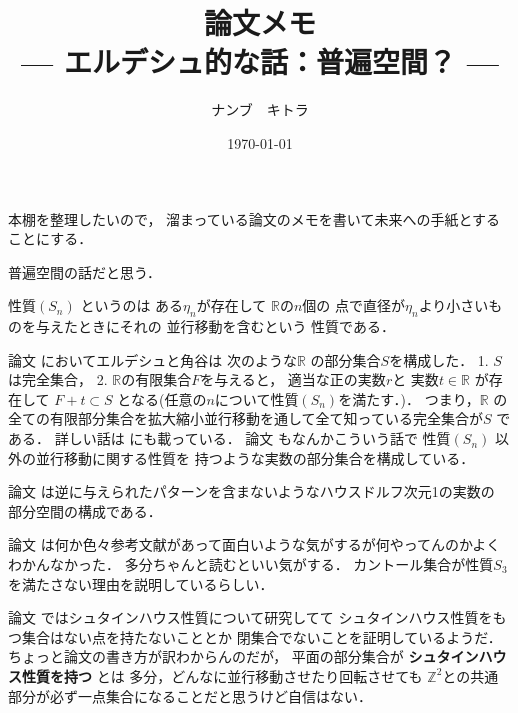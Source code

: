 \documentclass[leqno, a4paper, 12pt]{jsarticle}
\title{論文メモ
\large{\\--- エルデシュ的な話：普遍空間？ ---}
}
\author{ナンブ　キトラ}
\date{\today}
\newcommand{\zz}{\mathbb{Z}}
\newcommand{\rr}{\mathbb{R}}
\begin{document}
\maketitle

本棚を整理したいので，
溜まっている論文のメモを書いて未来への手紙とすることにする．

普遍空間の話だと思う．

性質$(S_{n})$
というのは
ある$\eta_{n}$が存在して
$\rr$の$n$個の
点で直径が$\eta_{n}$より小さいものを与えたときにそれの
並行移動を含むという
性質である．

論文
\cite{MR0089886}
においてエルデシュと角谷は
次のような$\rr$
の部分集合$S$を構成した．
1. $S$は完全集合，
2. $\rr$の有限集合$F$を与えると，
適当な正の実数$r$と
実数$t\in \rr$
が存在して
$ F+t\subset S$
となる(任意の$n$について性質$(S_{n})$を満たす．)．
つまり，$\rr$
の全ての有限部分集合を拡大縮小並行移動を通して全て知っている完全集合が$S$
である．
詳しい話は
\cite{plewik2003set}
にも載っている．
論文
\cite{MR0112938}
もなんかこういう話で
性質$(S_{n})$
以外の並行移動に関する性質を
持つような実数の部分集合を構成している．

論文
\cite{MR2431353}
は逆に与えられたパターンを含まないようなハウスドルフ次元1の実数の
部分空間の構成である．

論文
\cite{MR0366673}
は何か色々参考文献があって面白いような気がするが何やってんのかよくわかんなかった．
多分ちゃんと読むといい気がする．
カントール集合が性質$S_{3}$
を満たさない理由を説明しているらしい．

論文
\cite{MR1417342}
ではシュタインハウス性質について研究してて
シュタインハウス性質をもつ集合はない点を持たないこととか
閉集合でないことを証明しているようだ．
ちょっと論文の書き方が訳わからんのだが，
平面の部分集合が
\textbf{シュタインハウス性質を持つ}
とは
多分，どんなに並行移動させたり回転させても
$\zz^{2}$との共通部分が必ず一点集合になることだと思うけど自信はない．

\nocite{*}


\end{document}
